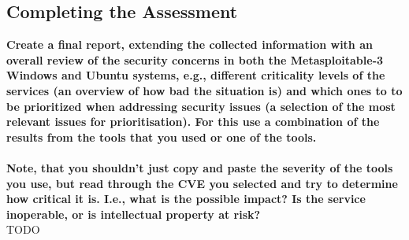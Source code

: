 \subsection*{Completing the Assessment}
\textbf{\dag
    Create a final report, extending the collected information with an overall review of the security concerns in both the Metasploitable-3 Windows and Ubuntu systems, e.g., different criticality levels of the services (an overview of how bad the situation is) and which ones to to be prioritized when addressing security issues (a selection of the most relevant issues for prioritisation). For this use a combination of the results from the tools that you used or one of the tools.\\\\
    Note, that you shouldn’t just copy and paste the severity of the tools you use, but read through the CVE you selected and try to determine how critical it is. I.e., what is the possible impact? Is the service inoperable, or is intellectual property at risk?}\\
TODO